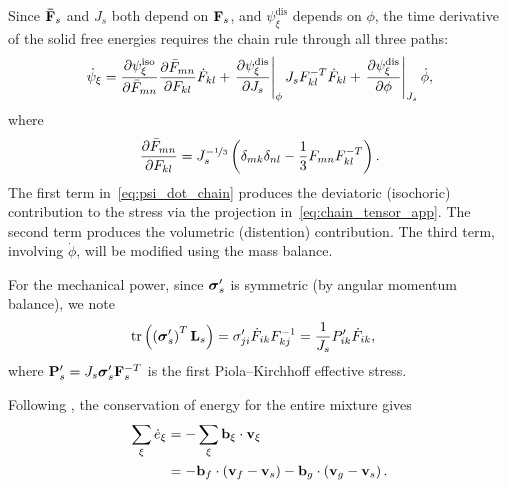 Since $\mathbf{\bar F}_s$ and $J_s$ both depend on $\mathbf{F}_s$, and $\psi^{\text{dis}}_\xi$ depends on $\phi$, the time derivative of the solid free energies requires the chain rule through all three paths:
\begin{align}
  \dot\psi_\xi = \frac{\partial \psi^{\text{iso}}_\xi}{\partial \bar{F}_{mn}} \frac{\partial \bar{F}_{mn}}{\partial F_{kl}} \dot{F}_{kl} + \left.\frac{\partial \psi^{\text{dis}}_\xi}{\partial J_s}\right\vert_\phi J_s F^{-T}_{kl} \dot{F}_{kl} + \left.\frac{\partial \psi^{\text{dis}}_\xi}{\partial \phi}\right\vert_{J_s}\dot\phi,
  \label{eq:psi_dot_chain}
\end{align}
where
\begin{align}
  \frac{\partial \bar{F}_{mn}}{\partial F_{kl}} = J_s^{-\nicefrac{1}{3}}\left(\delta_{mk}\delta_{nl} - \frac{1}{3} F_{mn} F^{-T}_{kl}\right).
  \label{eq:chain_tensor_app}
\end{align}
The first term in~\eqref{eq:psi_dot_chain} produces the deviatoric (isochoric) contribution to the stress via the projection in~\eqref{eq:chain_tensor_app}.  The second term produces the volumetric (distention) contribution.  The third term, involving $\dot\phi$, will be modified using the mass balance.

For the mechanical power, since $\boldsymbol{\sigma}'_s$ is symmetric (by angular momentum balance), we note
\begin{align}
  \mathrm{tr}\left(\left(\boldsymbol{\sigma}'_s\right)^T \mathbf{L}_s\right) &= \sigma'_{ji} \dot{F}_{ik} F^{-1}_{kj} = \frac{1}{J_s} P'_{ik} \dot{F}_{ik},
  \label{eq:mech_power_app}
\end{align}
where $\mathbf{P}'_s = J_s \boldsymbol{\sigma}'_s \mathbf{F}_s^{-T}$ is the first Piola--Kirchhoff effective stress.

Following \cite{drumheller1980thermomechanical}, the conservation of energy for the entire mixture gives
\begin{align}
  \sum_\xi \dot{e}_\xi &= -\sum_\xi \mathbf{b}_\xi \cdot \mathbf{v}_\xi \notag \\
  &= -\mathbf{b}_f \cdot \left(\mathbf{v}_f -  \mathbf{v}_s\right) - \mathbf{b}_g \cdot \left(\mathbf{v}_g - \mathbf{v}_s\right).
  \label{eq:disappation}
\end{align}

